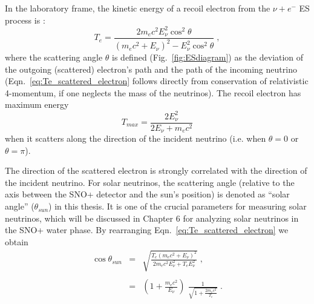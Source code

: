 In the laboratory frame, the kinetic energy of a recoil electron from the $\nu+e^-$ ES process is \cite{giunti2007fundamentals}:
\begin{equation}\label{eq:Te_scattered_electron}
T_e = \frac{2m_e c^2 E_\nu^2\cos^2\theta}{(m_e c^2 +E_\nu)^2-E_\nu^2\cos^2\theta}\;,
\end{equation}
where the scattering angle $\theta$ is defined (Fig.~\ref{fig:ESdiagram}) as the deviation of the outgoing (scattered) electron's path and the path of the incoming neutrino (Eqn.~\ref{eq:Te_scattered_electron} follows directly from conservation of relativistic 4-momentum, if one neglects the mass of the neutrinos). The recoil electron has maximum energy 
\begin{equation}
T_{max}=\frac{2E^2_\nu}{2E_\nu+m_e c^2} 
\end{equation}
when it scatters along the direction of the incident neutrino (i.e. when $\theta=0$ or $\theta=\pi$).

The direction of the scattered electron is strongly correlated with the direction of the incident neutrino. For solar neutrinos, the scattering angle (relative to the axis between the SNO+ detector and the sun's position) is denoted as ``solar angle'' ($\theta_{sun}$) in this thesis. It is one of the crucial parameters for measuring solar neutrinos, which will be discussed in Chapter 6 for analyzing solar neutrinos in the SNO+ water phase. By rearranging Eqn.~\ref{eq:Te_scattered_electron} we obtain \cite{giunti2007fundamentals}
\begin{eqnarray}\label{eq:costhetaSun}
\cos\theta_{sun} &=& \sqrt{\frac{T_e(m_e c^2 + E_\nu)^2}{2m_e c^2 E_\nu^2+T_eE_\nu^2}} \; , \nonumber \\
                 &\;& \\
                 &=& \left( 1 + \frac{m_e c^2}{E_{\nu}} \right) \; \frac{1}{\sqrt{1 + \frac{2 m_e c^2}{T_e}}} \; \nonumber.
\end{eqnarray}

